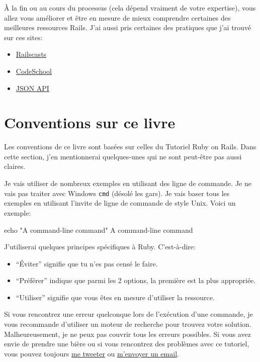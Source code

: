 \documentclass[]{report}
\begin{document}
  À la fin ou au cours du processus (cela dépend vraiment de votre expertise), vous allez vous améliorer et être en mesure de mieux comprendre certaines des meilleures ressources Rails. J'ai aussi pris certaines des pratiques que j'ai trouvé sur ces sites:

  \begin{itemize}
    \item \href{http://railscasts.com/}{Railscasts}
    \item \href{http://codeschool.com/}{CodeSchool}
    \item \href{http://jsonapi.org/format/}{JSON API}
  \end{itemize}

  \section{Conventions sur ce livre}

    Les conventions de ce livre sont basées sur celles du Tutoriel Ruby on Rails. Dans cette section, j'en mentionnerai quelques-unes qui ne sont peut-être pas aussi claires.

    Je vais utiliser de nombreux exemples en utilisant des ligne de commande. Je ne vais pas traiter avec Windows \verb|cmd| (désolé les gars). Je vais baser tous les exemples en utilisant l'invite de ligne de commande de style Unix. Voici un exemple:

    \begin{bashcode}
    echo "A command-line command"
    A command-line command
    \end{bashcode}

    J'utiliserai quelques principes spécifiques à Ruby. C'est-à-dire:

    \begin{itemize}
      \item \enquote{Éviter} signifie que tu n'es pas censé le faire.
      \item \enquote{Préférer} indique que parmi les 2 options, la première est la plus appropriée.
      \item \enquote{Utiliser} signifie que vous êtes en mesure d'utiliser la ressource.
    \end{itemize}

    Si vous rencontrez une erreur quelconque lors de l’exécution d'une commande, je vous recommande d'utiliser un moteur de recherche pour trouvez votre solution. Malheureusement, je ne peux pas couvrir tous les erreurs possibles. Si vous avez envie de prendre une bière ou si vous rencontrez des problèmes avec ce tutoriel, vous pouvez toujours \href{http://twitter.com/kurenn}{me tweeter} ou \href{mailto:contact@rousseau-alexandre.fr}{m'envoyer un email}.
\end{document}
